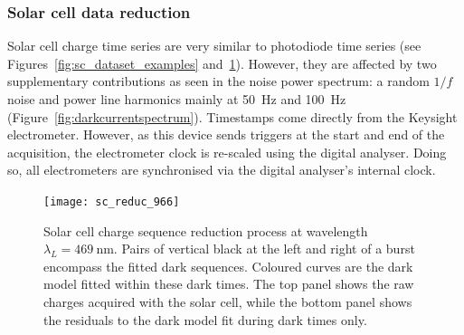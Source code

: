\subsubsection{Solar cell data reduction}
\label{sec:solar_reduction}

Solar cell charge time series are very similar to photodiode time series (see Figures~\ref{fig:sc_dataset_examples} and~\ref{fig:sc_reduc}). However, they are affected by two supplementary contributions as seen in the noise power spectrum: a random $1/f$ noise and power line harmonics mainly at \SI{50}{\hertz} and \SI{100}{\hertz} (Figure~\ref{fig:darkcurrentspectrum}). Timestamps come directly from the Keysight electrometer. However, as this device sends triggers at the start and end of the acquisition, the electrometer clock is re-scaled using the digital analyser. Doing so, all electrometers are synchronised via the digital analyser's internal clock.


\begin{figure}[!h]
\centering
\texttt{[image: sc\_reduc\_966]}
\caption{Solar cell charge sequence reduction process at wavelength $\lambda_L=\SI{469}{\nm}$. Pairs of vertical black at the left and right of a burst encompass the fitted dark sequences. Coloured curves are the dark model fitted within these dark times. The top panel shows the raw charges acquired with the solar cell, while the bottom panel shows the residuals to the dark model fit during dark times only.}\label{fig:sc_reduc}
\end{figure}

